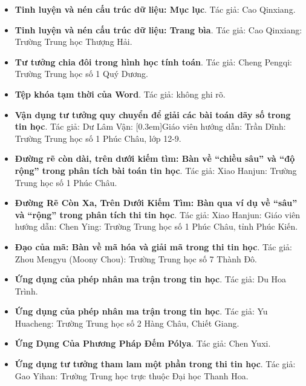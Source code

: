 \documentclass[11pt]{article}
\begin{document}
\begin{itemize}[leftmargin=2em]
  \item \textbf{Tinh luyện và nén cấu trúc dữ liệu: Mục lục}. Tác giả: Cao Qinxiang.
  \item \textbf{Tinh luyện và nén cấu trúc dữ liệu: Trang bìa}. Tác giả: Cao Qinxiang: Trường Trung học Thượng Hải.
  \item \textbf{Tư tưởng chia đôi trong hình học tính toán}. Tác giả: Cheng Pengqi: Trường Trung học số 1 Quý Dương.
  \item \textbf{Tệp khóa tạm thời của Word}. Tác giả: không ghi rõ.
  \item \textbf{Vận dụng tư tưởng quy chuyển để giải các bài toán dãy số trong tin học}. Tác giả: Dư Lâm Vận: [0.3em]\small Giáo viên hướng dẫn: Trần Dĩnh: \small Trường Trung học số 1 Phúc Châu, lớp 12-9.
  \item \textbf{Đường rẽ còn dài, trên dưới kiếm tìm: Bàn về ``chiều sâu'' và ``độ rộng'' trong phân tích bài toán tin học}. Tác giả: Xiao Hanjun: Trường Trung học số 1 Phúc Châu.
  \item \textbf{Đường Rẽ Còn Xa, Trên Dưới Kiếm Tìm: Bàn qua ví dụ về ``sâu'' và ``rộng'' trong phân tích thi tin học}. Tác giả: Xiao Hanjun: Giáo viên hướng dẫn: Chen Ying: Trường Trung học số 1 Phúc Châu, tỉnh Phúc Kiến.
  \item \textbf{Đạo của mã: Bàn về mã hóa và giải mã trong thi tin học}. Tác giả: Zhou Mengyu (Moony Chou): Trường Trung học số 7 Thành Đô.
  \item \textbf{Ứng dụng của phép nhân ma trận trong tin học}. Tác giả: Du Hoa Trình.
  \item \textbf{Ứng dụng của phép nhân ma trận trong tin học}. Tác giả: Yu Huacheng: Trường Trung học số 2 Hàng Châu, Chiết Giang.
  \item \textbf{Ứng Dụng Của Phương Pháp Đếm Pólya}. Tác giả: Chen Yuxi.
  \item \textbf{Ứng dụng tư tưởng tham lam một phần trong thi tin học}. Tác giả: Gao Yihan: Trường Trung học trực thuộc Đại học Thanh Hoa.
\end{itemize}
\end{document}
